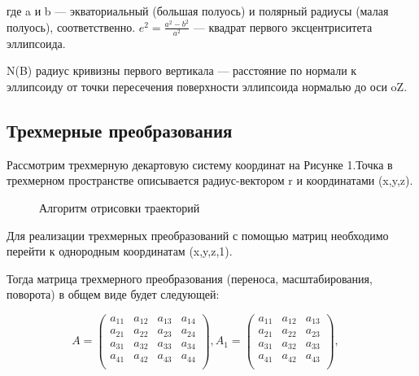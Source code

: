 \documentclass[14pt, a4paper]{extarticle}
\begin{document}
	где a и b — экваториальный (большая полуось) и полярный радиусы (малая полуось), соответственно.
	$e^2 = \frac{a^2 - b^2}{a^2}$ — квадрат первого эксцентриситета эллипсоида.\par
	 N(B) радиус кривизны первого вертикала — расстояние по нормали к эллипсоиду от точки пересечения поверхности эллипсоида нормалью до оси oZ.
	
	\clearpage
	\subsection{Трехмерные преобразования}
	Рассмотрим трехмерную декартовую систему координат на Рисунке 1.Точка в трехмерном пространстве описывается радиус-вектором r и координатами (x,y,z).
	
	\begin{figure}[h!]
		\caption{Алгоритм отрисовки траекторий}
	\end{figure}		
	
	
	
	 Для реализации трехмерных преобразований с помощью матриц необходимо перейти к однородным координатам (x,y,z,1).
	
	Тогда матрица трехмерного преобразования  (переноса, масштабирования, поворота) в общем виде будет следующей:
	
	$$
	A = 
	\begin{pmatrix} 
		a_{11} & a_{12} & a_{13} & a_{14} \\
		a_{21} & a_{22} & a_{23} & a_{24} \\
		a_{31} & a_{32} & a_{33} & a_{34} \\
		a_{41} & a_{42} & a_{43} & a_{44} \\
		\end{pmatrix},
	A_1 = 
	\begin{pmatrix} 
		a_{11} & a_{12} & a_{13} \\
		a_{21} & a_{22} & a_{23} \\
		a_{31} & a_{32} & a_{33} \\
		a_{41} & a_{42} & a_{43} \\
	\end{pmatrix},
	\quad
	$$
	
\end{document}

